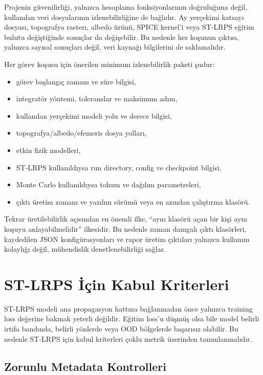 Projenin güvenilirliği, yalnızca hesaplama fonksiyonlarının doğruluğuna değil, kullanılan veri dosyalarının izlenebilirliğine de bağlıdır. Ay yerçekimi katsayı dosyası, topografya rasterı, albedo ürünü, SPICE kernel'i veya ST-LRPS eğitim bulutu değiştiğinde sonuçlar da değişebilir. Bu nedenle her koşunun çıktısı, yalnızca sayısal sonuçları değil, veri kaynağı bilgilerini de saklamalıdır.

Her görev koşusu için önerilen minimum izlenebilirlik paketi şudur:
\begin{itemize}
    \item görev başlangıç zamanı ve süre bilgisi,
    \item integratör yöntemi, toleranslar ve maksimum adım,
    \item kullanılan yerçekimi modeli yolu ve derece bilgisi,
    \item topografya/albedo/efemeris dosya yolları,
    \item etkin fizik modelleri,
    \item ST-LRPS kullanıldıysa run directory, config ve checkpoint bilgisi,
    \item Monte Carlo kullanıldıysa tohum ve dağılım parametreleri,
    \item çıktı üretim zamanı ve yazılım sürümü veya en azından çalıştırma klasörü.
\end{itemize}

Tekrar üretilebilirlik açısından en önemli ilke, ``aynı klasörü açan bir kişi aynı koşuyu anlayabilmelidir'' ilkesidir. Bu nedenle zaman damgalı çıktı klasörleri, kaydedilen JSON konfigürasyonları ve rapor üretim çıktıları yalnızca kullanım kolaylığı değil, mühendislik denetlenebilirliği sağlar.

\section{ST-LRPS İçin Kabul Kriterleri}
\label{sec:st_lrps_acceptance}

ST-LRPS modeli ana propagasyon hattına bağlanmadan önce yalnızca training loss değerine bakmak yeterli değildir. Eğitim loss'u düşmüş olsa bile model belirli irtifa bandında, belirli yönlerde veya OOD bölgelerde başarısız olabilir. Bu nedenle ST-LRPS için kabul kriterleri çoklu metrik üzerinden tanımlanmalıdır.

\subsection{Zorunlu Metadata Kontrolleri}

